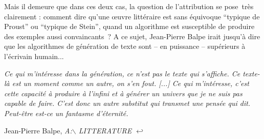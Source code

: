 \documentclass{article}
\newenvironment{citationbox}
{\begin{center}
		\begin{minipage}{.8\textwidth}
		}
		{
		\end{minipage}	
\end{center}
}
\begin{document}
				Mais il demeure que dans ces deux cas, la question de l'attribution se pose très clairement : comment dire qu'une œuvre littéraire est sans équivoque ``typique de Proust'' ou ``typique de Stein'', quand un algorithme est susceptible de produire des exemples aussi convaincants ? A ce sujet, Jean-Pierre Balpe irait jusqu'à dire que les algorithmes de génération de texte sont -- en puissance -- supérieurs à l'écrivain humain...
				\begin{citationbox}
					\textit{Ce qui m’intéresse dans la génération, ce n’est pas le texte qui s’affiche. Ce texte-là est
				un moment comme un autre, on s’en fout. [...] Ce qui m’intéresse, c’est cette capacité à
				produire à l’infini et à générer un univers que je ne suis pas capable de faire. C’est donc un
				autre substitut qui transmet une pensée qui dit. Peut-être est-ce un fantasme d’éternité.}
					\begin{flushright}
						Jean-Pierre Balpe, \textit{A:{$\backslash$ LITTERATURE $\hookleftarrow$}}\cite{balpebootz1994}
					\end{flushright}
				\end{citationbox}

				
\end{document}
